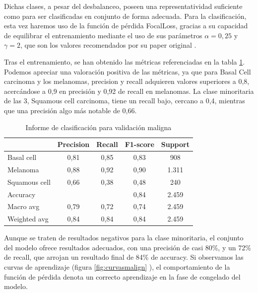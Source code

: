  Dichas clases, a pesar del desbalanceo, poseen una representatividad suficiente como para ser clasificadas en conjunto de forma adecuada. Para la clasificación, esta vez haremos uso de la función de pérdida FocalLoss, gracias a su capacidad de equilibrar el entrenamiento mediante el uso de sus parámetros $\alpha = 0,25$ y $\gamma = 2$, que son los valores recomendados por su paper original \cite{lin2018focal}.
 
 Tras el entrenamiento, se han obtenido las métricas referenciadas en la tabla \ref{tab:malignometrics}. Podemos apreciar una valoración positiva de las métricas, ya que para Basal Cell carcinoma y los melanomas, precision y recall adquieren valores superiores a 0,8, acercándose a 0,9 en precisión y 0,92 de recall en melanomas.  La clase minoritaria de las 3, Squamous cell carcinoma, tiene un recall bajo, cercano a 0,4, mientras que una precisión algo más notable de 0,66.

\begin{table}[!ht]
	\centering
	\begin{tabular}{|l|c|c|c|c|}
		\hline
		& Precision & Recall & F1-score & Support \\
		\hline
		Basal cell & 0,81 & 0,85 & 0,83 & 908 \\
		Melanoma & 0,88 & 0,92 & 0,90 & 1.311 \\
		Squamous cell & 0,66 & 0,38 & 0,48 & 240 \\
		\hline
		Accuracy &  &  & 0,84 & 2.459 \\
		Macro avg & 0,79& 0,72& 0,74&2.459\\
		Weighted avg&0,84&0,84&0,84&2.459\\
		\hline
	\end{tabular}
	\caption{Informe de clasificación para validación maligna}
	\label{tab:malignometrics}
\end{table}

Aunque se traten de resultados negativos para la clase minoritaria, el conjunto del modelo ofrece resultados  adecuados, con una precisión de casi 80\%, y un 72\% de recall, que arrojan un resultado final de 84\% de accuracy. Si observamos las curvas de aprendizaje (figura \ref{fig:curvasmalign} ), el comportamiento de la función de pérdida denota un correcto aprendizaje en la fase de congelado del modelo.

